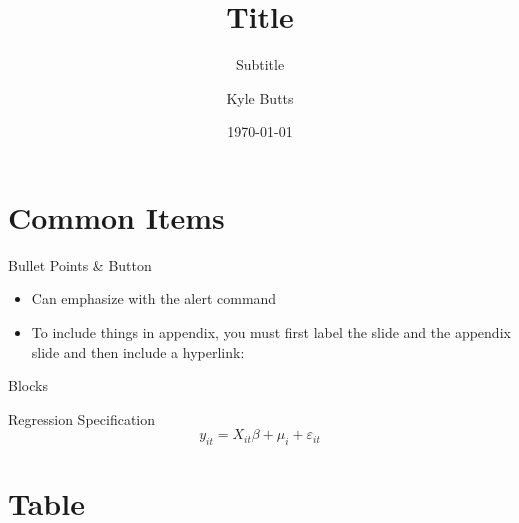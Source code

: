 \documentclass[aspectratio=43]{beamer}
\title{Title}
\subtitle{Subtitle}
\date{\today}
\author{Kyle Butts}
\begin{document}
\maketitle

\section{Common Items}

\begin{frame}{Bullet Points \& Button}\label{main1}
    \begin{itemize}
        \item Can emphasize with \alert{the alert command}
        
        \item To include things in appendix, you must first label the slide and the appendix slide and then include a hyperlink:
        
        \hyperlink{appendix1}{}
    \end{itemize}
\end{frame}

\begin{frame}{Blocks}
    \begin{block}{Regression Specification}
        \[
            y_{it} = X_{it} \beta + \mu_i + \varepsilon_{it}
        \]
    \end{block}
\end{frame}

\section{Table}
\end{document}
